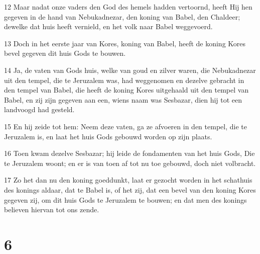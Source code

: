 \par 12 Maar nadat onze vaders den God des hemels hadden vertoornd, heeft Hij hen gegeven in de hand van Nebukadnezar, den koning van Babel, den Chaldeer; dewelke dat huis heeft vernield, en het volk naar Babel weggevoerd.
\par 13 Doch in het eerste jaar van Kores, koning van Babel, heeft de koning Kores bevel gegeven dit huis Gods te bouwen.
\par 14 Ja, de vaten van Gods huis, welke van goud en zilver waren, die Nebukadnezar uit den tempel, die te Jeruzalem was, had weggenomen en dezelve gebracht in den tempel van Babel, die heeft de koning Kores uitgehaald uit den tempel van Babel, en zij zijn gegeven aan een, wiens naam was Sesbazar, dien hij tot een landvoogd had gesteld.
\par 15 En hij zeide tot hem: Neem deze vaten, ga ze afvoeren in den tempel, die te Jeruzalem is, en laat het huis Gods gebouwd worden op zijn plaats.
\par 16 Toen kwam dezelve Sesbazar; hij leide de fondamenten van het huis Gods, Die te Jeruzalem woont; en er is van toen af tot nu toe gebouwd, doch niet volbracht.
\par 17 Zo het dan nu den koning goeddunkt, laat er gezocht worden in het schathuis des konings aldaar, dat te Babel is, of het zij, dat een bevel van den koning Kores gegeven zij, om dit huis Gods te Jeruzalem te bouwen; en dat men des konings believen hiervan tot ons zende.

\chapter{6}

